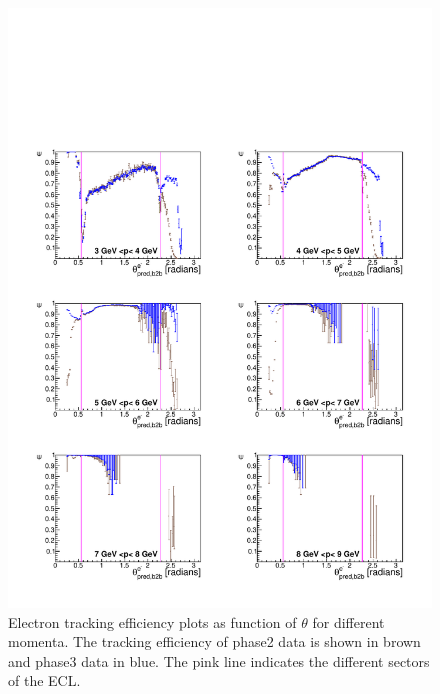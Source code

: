 \documentclass[a4paper,11pt,twosided,final,german,openbib,pdftex,listof=totoc,bibliography=totoc]{scrbook}
\begin{document}
\begin{figure}[!htbp]
	\centering
	\includegraphics[width=\textwidth]{Plots/comp/cMThetaem_Data.pdf}
	\caption[Momentum $\theta$ Electron Efficiency]{Electron tracking efficiency plots as function of $\theta$ for different momenta. The tracking efficiency of phase2 data is shown in brown and phase3 data in blue. The pink line indicates the different sectors of the ECL.}
	\label{plt:compThetaem}
\end{figure}
\end{document}
